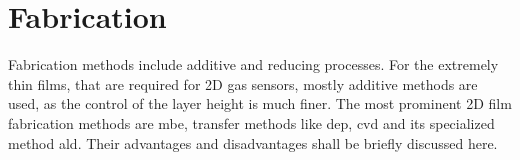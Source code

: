 \section{Fabrication}
\label{sec:fabrication}
Fabrication methods include additive and reducing processes. For the extremely thin films, that are required for 2D gas sensors, mostly additive methods are used, as the control of the layer height is much finer. The most prominent 2D film fabrication methods are \gls{mbe}, transfer methods like \gls{dep}, \gls{cvd} and its specialized method \gls{ald}. Their advantages and disadvantages shall be briefly discussed here. 
